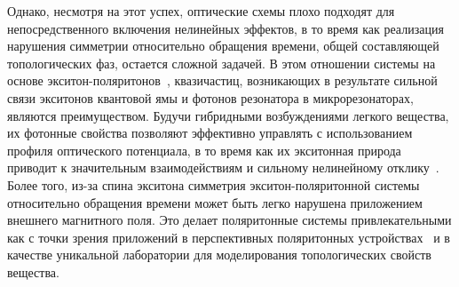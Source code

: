 \documentclass[
aps,
prl,
groupedaddress,
superscriptaddress,
floatfix,
notitlepage
]{revtex4-1}
\begin{document}
Однако, несмотря на этот успех, оптические схемы плохо подходят для непосредственного включения нелинейных эффектов, в то время как реализация нарушения симметрии относительно обращения времени, общей составляющей топологических фаз, остается сложной задачей.
В этом отношении системы на основе экситон-поляритонов~\cite{Carusotto2013}, квазичастиц, возникающих в результате сильной связи экситонов квантовой ямы и фотонов резонатора в микрорезонаторах, являются преимуществом.
Будучи гибридными возбуждениями легкого вещества, их фотонные свойства позволяют эффективно управлять с использованием профиля оптического потенциала, в то время как их экситонная природа приводит к значительным взаимодействиям и сильному нелинейному отклику~\cite{CedraMendez2010,Kim2013,Jacqmin2014,Baboux2016}.
Более того, из-за спина экситона симметрия экситон-поляритонной системы относительно обращения времени может быть легко нарушена приложением внешнего магнитного поля. Это делает поляритонные системы привлекательными как с точки зрения приложений в перспективных поляритонных устройствах~\cite{Liew2011,Sanvitto2016} и в качестве уникальной лаборатории для моделирования топологических свойств вещества.
\end{document}
